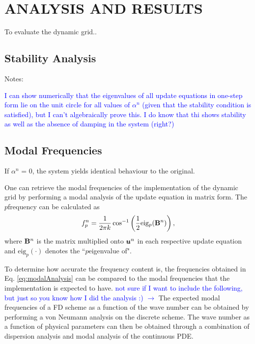 \documentclass[fleqn]{jaes}
\def\SWcomment[#1]{\textcolor{blue}{#1}}
\begin{document}
\section{ANALYSIS AND RESULTS}\label{sec:analysis}
To evaluate the dynamic grid..

\subsection{Stability Analysis}
Notes:

\SWcomment[I can show numerically that the eigenvalues of all update equations in one-step form lie on the unit circle for all values of $\alpha^n$ (given that the stability condition is satisfied), but I can't algebraically prove this. I do know that thi shows stability as well as the absence of damping in the system (right?)]
\subsection{Modal Frequencies}

If $\alpha^n$ = 0, the system yields identical behaviour to the original. 

One can retrieve the modal frequencies of the implementation of the dynamic grid by performing a modal analysis of the update equation in matrix form. The $p$\th frequency can be calculated as
\begin{equation}\label{eq:modalAnalysis}
    f_p^n = \frac{1}{2 \pi k}\cos^{-1}\left(\frac{1}{2}\text{eig}_p(\B^n)\right),
\end{equation}
where $\mathbf{B}^n$ is the matrix multiplied onto $\boldsymbol{u}^n$ in each respective update equation and $\text{eig}_p(\cdot)$ denotes the ``$p$\th eigenvalue of".

To determine how accurate the frequency content is, the frequencies obtained in Eq. \eqref{eq:modalAnalysis} can be compared to the modal frequencies that the implementation is expected to have. \SWcomment[not sure if I want to include the following, but just so you know how I did the analysis :) $\rightarrow$]
The expected modal frequencies of a FD scheme as a function of the wave number can be obtained by performing a von Neumann analysis on the discrete scheme. The wave number as a function of physical parameters can then be obtained through a combination of dispersion analysis and modal analysis of the continuous PDE. 

\end{document}

